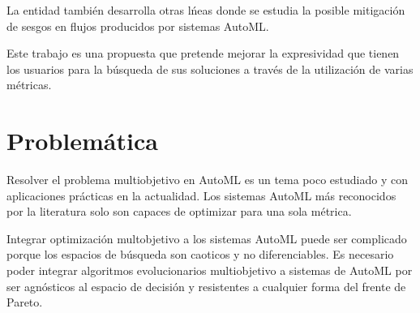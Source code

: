 La entidad tambi\'en desarrolla otras l\'neas donde se estudia la posible mitigaci\'on de sesgos en flujos producidos por sistemas AutoML.

Este trabajo es una propuesta que pretende mejorar la expresividad que tienen los usuarios para la b\'usqueda de sus soluciones a trav\'es de la utilizaci\'on de varias m\'etricas.

\section*{Problem\'atica}
Resolver el problema multiobjetivo en AutoML es un tema poco estudiado y con aplicaciones pr\'acticas en la actualidad.
Los sistemas AutoML m\'as reconocidos por la literatura solo son capaces de optimizar para una sola m\'etrica. 

Integrar optimizaci\'on multobjetivo a los sistemas AutoML puede ser complicado porque los espacios de b\'usqueda  son caoticos y no diferenciables. Es necesario poder integrar algoritmos evolucionarios multiobjetivo a sistemas de AutoML por ser agn\'osticos al espacio de decisi\'on y resistentes a cualquier forma del frente de Pareto.





